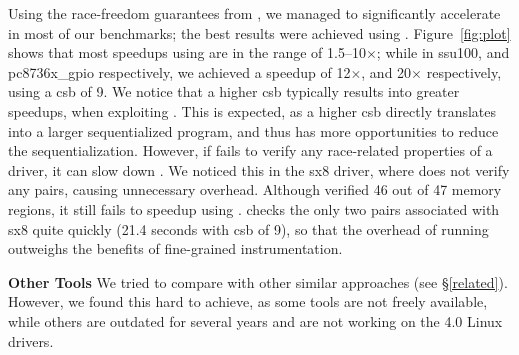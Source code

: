 Using the race-freedom guarantees from \whoop, we managed to significantly accelerate \corral in most of our benchmarks; the best results were achieved using \yieldmr. Figure~\ref{fig:plot} shows that most speedups using \yieldmr are in the range of 1.5--10$\times$; while in ssu100, and pc8736x\_gpio respectively, we achieved a speedup of 12$\times$, and 20$\times$ respectively, using a csb of 9. We notice that a higher csb typically results into greater speedups, when exploiting \whoop. This is expected, as a higher csb directly translates into a larger sequentialized program, and thus \whoop has more opportunities to reduce the sequentialization.
%
However, if \whoop fails to verify any race-related properties of a driver, it can slow down \corral. We noticed this in the sx8 driver, where \whoop does not verify any pairs, causing unnecessary overhead. Although \whoop verified 46 out of 47 memory regions, it still fails to speedup \corral using \yieldmr. \corral checks the only two pairs associated with sx8 quite quickly (21.4 seconds with csb of 9), so that the overhead of running \whoop outweighs the benefits of fine-grained instrumentation.

\noindent\textbf{Other Tools }
%
We tried to compare \whoop with other similar approaches (see \S\ref{related}). However, we found this hard to achieve, as some tools are not freely available, while others are outdated for several years and are not working on the 4.0 Linux drivers.
